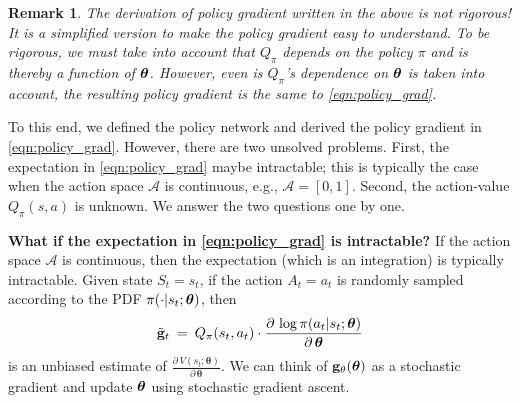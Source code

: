\documentclass[11pt]{article}
\numberwithin{equation}{section}
\newtheorem{remark}{Remark}[section]
\def\g{{\bf g}}
\def\AM{{\mathcal A}}
\def\tha{\mbox{\boldmath$\theta$\unboldmath}}
\begin{document}
\begin{remark}
The derivation of policy gradient written in the above is not rigorous!
It is a simplified version to make the policy gradient easy to understand.
To be rigorous, we must take into account that $Q_\pi$ depends on the policy $\pi$ and is thereby a function of $\tha$.
However, even is $Q_\pi$'s dependence on $\tha$ is taken into account, the resulting policy gradient is the same to \eqref{eqn:policy_grad}.
\end{remark}


To this end, we defined the policy network and derived the policy gradient in \eqref{eqn:policy_grad}.
However, there are two unsolved problems.
First, the expectation in \eqref{eqn:policy_grad} maybe intractable; this is typically the case when the action space $\AM$ is continuous, e.g., $\AM=[0, 1]$.
Second, the action-value $Q_\pi  (s, a) $ is unknown.
We answer the two questions one by one.


\textbf{What if the expectation in \eqref{eqn:policy_grad} is intractable?}
If the action space $\AM$ is continuous, then the expectation (which is an integration) is typically intractable.
Given state $S_t=s_t$, if the action $A_t = a_t$ is randomly sampled according to the PDF $\pi (\cdot | s_t ; \tha )$, then 
\begin{equation*}
    \tilde{\g}_t
    \: = \: Q_\pi  (s_t, a_t)  \cdot \frac{\partial \,  \log \pi (a_t | s_t; \tha )}{\partial \, \tha }
\end{equation*}
is an unbiased estimate of $\frac{\partial \, V (s_t ; \mathbf{\theta} )}{\partial \,\mathbf{ \theta} }$.
We can think of $\g_{\theta } (\tha )$ as a stochastic gradient and update $\tha$ using stochastic gradient ascent.
\end{document}

